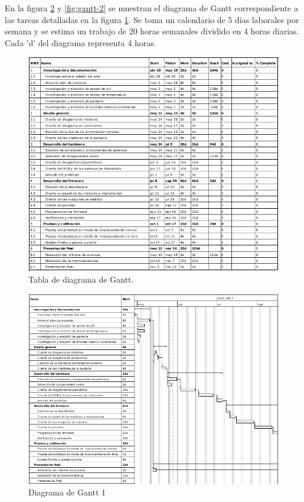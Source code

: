 \documentclass[
11pt, %
codirector, %
]{charter}
\begin{document}
En la figura \ref{fig:gantt-1} y \ref{fig:gantt-2} se muestran el diagrama de Gantt correspondiente a las tareas detalladas en la figura \ref{fig:tasks}. Se toma un calendario de 5 días laborales por semana y se estima un trabajo de 20 horas semanales dividido en 4 horas diarias. Cada 'd' del diagrama representa 4 horas.

\begin{figure}[htpb]
\centering 
\includegraphics[width=1\textwidth]{./Figuras/tasks.png}
\caption{Tabla de diagrama de Gantt.}
\label{fig:tasks}
\end{figure}

\begin{figure}[htpb]
\centering 
\includegraphics[width=1\textwidth]{./Figuras/gantt-1.png}
\caption{Diagrama de Gantt 1}
\label{fig:gantt-1}
\end{figure}
\end{document}
